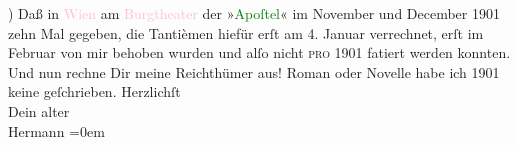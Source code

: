            ) Daß in \textcolor{pink}{Wien}{}\ledrightnote{\textcolor{pink}{Wien}} am \textcolor{pink}{Burgtheater}{}\ledrightnote{\textcolor{pink}{Burgtheater}} der »\textcolor{green}{Apoſtel}{}\ledrightnote{\textcolor{green}{Der Apostel}}« im November
               und December 1901 zehn Mal gegeben, die {\pb}Tantièmen
               hiefür erſt am 4. Januar verrechnet, erſt im Februar von mir behoben wurden und alſo
               nicht \textsc{pro} 1901 fatiert werden konnten. Und nun rechne Dir
               meine Reichthümer aus! Roman oder Novelle habe ich 1901 keine geſchrieben.\pend
           \pstart
           Herzlichſt{\\[\baselineskip]}Dein alter{\\[\baselineskip]}\spacefill\mbox{Hermann}\pend
           \leftskip=0em{}\endnumbering{}  
      